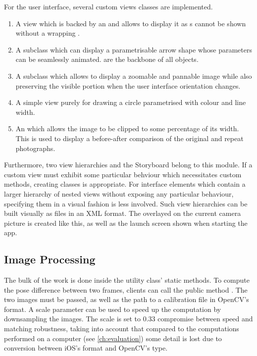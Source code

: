 For the user interface, several custom views classes are implemented.
\begin{enumerate}
   \item {} A view which is backed by an  and
      allows to display it as s cannot be shown without a
      wrapping .
   \item {} A  subclass which can display a
      parametrisable arrow shape whose parameters can be seamlessly animated.
       are the backbone of all  objects.
   \item {} A  subclass which allows to
      display a zoomable and pannable image while also preserving the visible
      portion when the user interface orientation changes.
   \item {} A simple view purely for drawing a circle parametrised
      with colour and line width.
   \item {} An  which allows the
      image to be clipped to some percentage of its width. This is used to
      display a before-after comparison of the original and repeat photographs.
\end{enumerate}

Furthermore, two view hierarchies and the Storyboard belong to this module.  If
a custom view must exhibit some particular behviour which necessitates custom
methods, creating classes is appropriate. For interface elements which contain a
larger hierarchy of nested views without exposing any particular behaviour,
specifying them in a visual fashion is less involved. Such view hierarchies can
be built visually as  files in an XML format. The
 overlayed on the current camera picture is created like
this, as well as the launch screen shown when starting the app.


\subsection{Image Processing}

The bulk of the work is done inside the utility class'  static
methods. To compute the pose difference between two frames, clients can call the
public method
.
The two images must be passed, as well as the path to a calibration file in
OpenCV's  format. A scale parameter can be used to speed up
the computation by downsampling the images.  The scale is set to $0.33$
compromise between speed and matching robustness, taking into account that
compared to the computations performed on a computer (see
\autoref{ch:evaluation}) some detail is lost due to conversion between iOS's
 format and OpenCV's  type.

